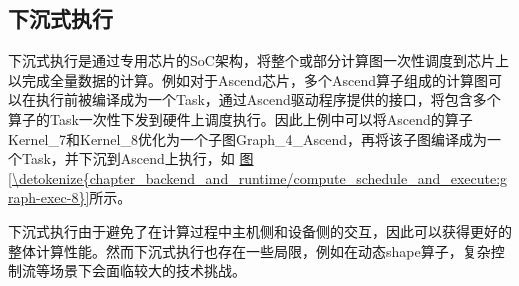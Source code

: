 \documentclass[letterpaper,10pt,english]{sphinxmanual}
\begin{document}
\subsection{下沉式执行}
\label{\detokenize{chapter_backend_and_runtime/compute_schedule_and_execute:id5}}
\sphinxAtStartPar
下沉式执行是通过专用芯片的SoC架构，将整个或部分计算图一次性调度到芯片上以完成全量数据的计算。例如对于Ascend芯片，多个Ascend算子组成的计算图可以在执行前被编译成为一个Task，通过Ascend驱动程序提供的接口，将包含多个算子的Task一次性下发到硬件上调度执行。因此上例中可以将Ascend的算子Kernel\_7和Kernel\_8优化为一个子图Graph\_4\_Ascend，再将该子图编译成为一个Task，并下沉到Ascend上执行，如
\hyperref[\detokenize{chapter_backend_and_runtime/compute_schedule_and_execute:graph-exec-8}]{图\ref{\detokenize{chapter_backend_and_runtime/compute_schedule_and_execute:graph-exec-8}}}所示。

\sphinxAtStartPar
下沉式执行由于避免了在计算过程中主机侧和设备侧的交互，因此可以获得更好的整体计算性能。然而下沉式执行也存在一些局限，例如在动态shape算子，复杂控制流等场景下会面临较大的技术挑战。
\end{document}
